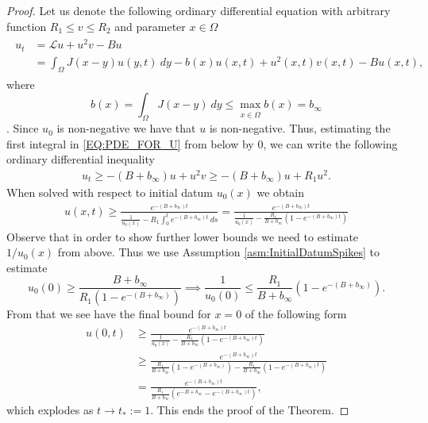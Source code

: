 \documentclass[12pt, a4paper]{article}
\theoremstyle{break}
\theoremstyle{break}
\theoremstyle{break}
\theoremstyle{break}
\theoremstyle{break}
\theoremstyle{break}
\theoremstyle{break}
\begin{document}
\begin{proof}
    Let us denote the following ordinary differential equation with arbitrary function $R_1 \leq v \leq R_2$ and parameter $x \in \Omega$
    \begin{align}
        \label{EQ:PDE_FOR_U}
        \begin{split}
            u_t 
            &= \mathcal{L} u + u^2v - B u \\
            &= \int_\Omega J(x-y) u(y,t) \:dy - b(x) u(x,t) + u^2(x,t)v(x,t) - B u(x,t),
        \end{split}
    \end{align}
    where 
    \begin{equation}
        b(x) = \int_\Omega J(x-y)\:dy \leq \max_{x\in \overline{\Omega}} b(x) = b_\infty
    \end{equation}. 
    Since $u_0$ is non-negative we have that $u$ is non-negative. Thus, estimating the first integral in \eqref{EQ:PDE_FOR_U} from below by 0, we can write the following ordinary differential inequality
    \begin{align}
        \label{EQ:ODI_FOR_U}
        u_t \geq -(B + b_\infty) u + u^2 v \geq -(B + b_\infty) u + R_1 u^2.
    \end{align}
    When solved with respect to initial datum $u_0(x)$ we obtain
    \begin{align}
        \label{ODI_FOR_U_SOL}
        u(x, t) \geq \frac{e^{-(B + b_\infty ) t}}{\frac{1}{u_0(x)} - R_1 \int_0^t e^{-(B + b_\infty ) t}\:ds} = \frac{e^{-(B + b_\infty ) t}}{\frac{1}{u_0(x)} - \frac{R_1}{B + b_\infty} (1 - e^{-(B + b_\infty) t} )}
    \end{align}
    Observe that in order to show further lower bounds we need to estimate $1/u_0(x)$ from above. Thus we use Assumption \ref{asm:InitialDatumSpikes} to estimate
    \begin{equation*}
        u_0(0) \geq \frac{B + b_\infty}{R_1 (1 - e^{-(B+b_\infty)}) } \implies \frac{1}{u_0(0)} \leq \frac{R_1}{B + b_\infty} (1 - e^{-(B+b_\infty)}).
    \end{equation*}
    From that we see have the final bound for $x = 0$ of the following form
    \begin{align*}
        u(0, t) 
        &\geq \frac{e^{-(B + b_\infty ) t}}{\frac{1}{u_0(x)} - \frac{R_1}{B + b_\infty} (1 - e^{-(B + b_\infty) t} )} \\
        &\geq \frac{e^{-(B + b_\infty ) t}}{\frac{R_1}{B + b_\infty} (1 - e^{-(B+b_\infty)}) - \frac{R_1}{B + b_\infty} (1 - e^{-(B + b_\infty) t} )} \\
        &= \frac{e^{-(B + b_\infty ) t}}{\frac{R_1}{B + b_\infty} (e^{-B + b_\infty} - e^{-(B+b_\infty) t})},
    \end{align*}
    which explodes as $t \rightarrow t_* := 1$. This ends the proof of the Theorem.
\end{proof}
\end{document}
